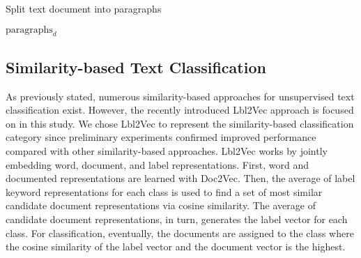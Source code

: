 \documentclass[sigconf]{acmart}
\begin{document}
\begin{algorithm}
    \caption{Split text document into paragraphs}
    \label{alg:split_docs}
    \begin{algorithmic}[0]
    \Require
            \Else
            \EndIf
        \EndFor
        \Return $\textrm{paragraphs}_d$
    \EndProcedure
    \end{algorithmic}
\end{algorithm}



\subsection{Similarity-based Text Classification}\label{sec:similarity-based-classsification}

As previously stated, numerous similarity-based approaches for unsupervised text classification exist. However, the recently introduced Lbl2Vec approach \cite{webist21} is focused on in this study. We chose Lbl2Vec to represent the similarity-based classification category since preliminary experiments confirmed improved performance compared with other similarity-based approaches. Lbl2Vec works by jointly embedding word, document, and label representations. First, word and documented representations are learned with Doc2Vec. Then, the average of label keyword representations for each class is used to find a set of most similar candidate document representations via cosine similarity. The average of candidate document representations, in turn, generates the label vector for each class. For classification, eventually, the documents are assigned to the class where the cosine similarity of the label vector and the document vector is the highest.
\end{document}
